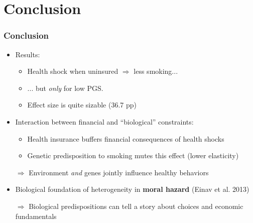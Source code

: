 \documentclass[10pt,compress,xcolor=dvipsnames]{beamer}    %
\begin{document}
\section{Conclusion}

\begin{frame} \frametitle{Conclusion}
\begin{itemize}
	\item Results:
	\begin{itemize}
		\item Health shock when uninsured $\Rightarrow$ less smoking...
		\item ... but \textit{only} for low PGS.
		\item Effect size is quite sizable (36.7 pp)
	\end{itemize}

	\vspace{3ex}

	\item Interaction between financial and ``biological'' constraints:
	\begin{itemize}
		\item Health insurance buffers financial consequences of health shocks
		\item Genetic predisposition to smoking mutes this effect (lower elasticity)
	\end{itemize}

	\item[$\Rightarrow$] Environment \emph{and} genes jointly influence healthy behaviors

	\vspace{3ex}

	\item Biological foundation of heterogeneity in \textbf{moral hazard} (Einav et al. 2013) %
	\item[$\Rightarrow$] Biological predispositions can tell a story about choices and economic fundamentals

\end{itemize}
\end{frame}
\end{document}

